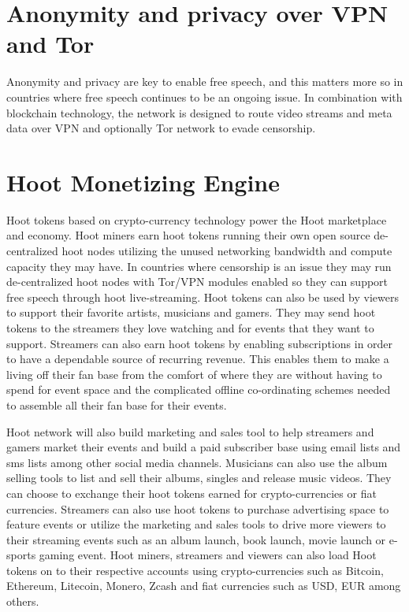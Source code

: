 \documentclass{article}
\begin{document}
\section{Anonymity and privacy over VPN and Tor}
Anonymity and privacy are key to enable free speech, and this matters
more so in countries where free speech continues to be an ongoing
issue. In combination with blockchain technology, the network is
designed to route video streams and meta data over VPN and optionally
Tor network to evade censorship.

\section{Hoot Monetizing Engine}
Hoot tokens based on crypto-currency technology power the Hoot
marketplace and economy. Hoot miners earn hoot tokens running their own open source
de-centralized hoot nodes utilizing the unused networking bandwidth
and compute capacity they may have. In countries where censorship is an issue they
may run de-centralized hoot nodes with Tor/VPN modules enabled so they can
support free speech through hoot
live-streaming. Hoot tokens can also be used by viewers to support their favorite artists,
musicians and gamers. They may send hoot tokens to the
streamers they love watching and for events that they want to
support. Streamers can also earn hoot tokens by enabling subscriptions in order to have a
dependable source of recurring revenue. This enables them to make a
living off their fan base from the comfort of where they are without
having to spend for event space and the complicated offline
co-ordinating schemes needed to assemble all their fan base for their events.

 Hoot network will also build marketing and sales tool to help
streamers and gamers market their 
events and build a paid subscriber base using email lists and sms lists among other social media
channels. 
Musicians can also use the album selling tools to list and sell
their albums, singles and release music videos. They can
choose to exchange their hoot tokens earned for crypto-currencies or fiat currencies.
 Streamers can also use hoot tokens to
purchase advertising space to feature events or utilize the marketing and sales
tools to drive more viewers to their
streaming events such as an album launch, book launch, movie launch or
e-sports gaming event. Hoot miners, streamers and viewers can also load Hoot
tokens on to their respective accounts using crypto-currencies such as Bitcoin,
Ethereum, Litecoin, Monero, Zcash and fiat currencies such as USD, EUR among others.
\end{document}

